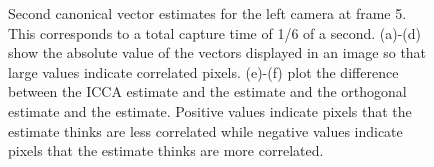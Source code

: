 \begin{figure}
\begin{center}
{    }
    \caption{Second canonical vector estimates for the left camera at frame 5. This corresponds
      to a total capture time of 1/6 of a second. (a)-(d) show the absolute value of the
      vectors displayed in an image so that large values indicate correlated
      pixels. (e)-(f) plot the difference between the ICCA estimate and the \iccap
      estimate and the orthogonal estimate and the \iccap estimate. Positive values
      indicate pixels that the \iccap estimate thinks are less correlated while negative
      values indicate pixels that the \iccap estimate thinks are more correlated. }
    \label{fig:chpt5:flashing2_2}
  \end{center}
\end{figure}

